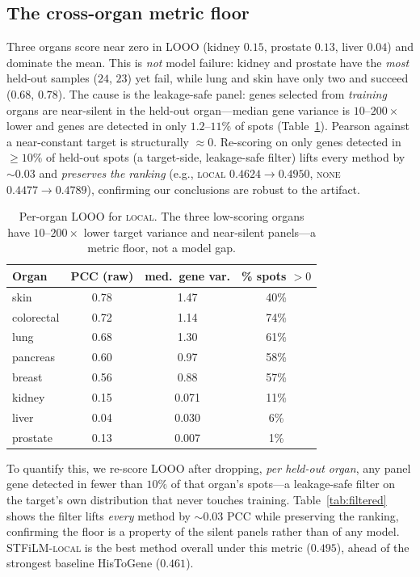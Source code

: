 \documentclass[10pt,twocolumn,letterpaper]{article}
\begin{document}
\subsection{The cross-organ metric floor}
\label{sec:floor}
Three organs score near zero in LOOO (kidney $0.15$, prostate $0.13$, liver $0.04$) and
dominate the mean. This is \emph{not} model failure: kidney and prostate have the \emph{most}
held-out samples ($24$, $23$) yet fail, while lung and skin have only two and succeed
($0.68$, $0.78$). The cause is the leakage-safe panel: genes selected from \emph{training}
organs are near-silent in the held-out organ---median gene variance is $10$--$200\times$ lower
and genes are detected in only $1.2$--$11\%$ of spots (Table~\ref{tab:floor}). Pearson against a
near-constant target is structurally $\approx 0$. Re-scoring on only genes detected in
$\ge 10\%$ of held-out spots (a target-side, leakage-safe filter) lifts every method by
${\sim}0.03$ and \emph{preserves the ranking} (e.g., \textsc{local} $0.4624\!\to\!0.4950$,
\textsc{none} $0.4477\!\to\!0.4789$), confirming our conclusions are robust to the artifact.

\begin{table}[t]
\centering
\small
\setlength{\tabcolsep}{3pt}
\begin{tabular}{lccc}
\toprule
Organ & PCC (raw) & med.\ gene var. & \% spots $>0$ \\
\midrule
skin       & 0.78 & 1.47 & 40\% \\
colorectal & 0.72 & 1.14 & 74\% \\
lung       & 0.68 & 1.30 & 61\% \\
pancreas   & 0.60 & 0.97 & 58\% \\
breast     & 0.56 & 0.88 & 57\% \\
\midrule
kidney     & 0.15 & 0.071 & 11\% \\
liver      & 0.04 & 0.030 & 6\% \\
prostate   & 0.13 & 0.007 & 1\% \\
\bottomrule
\end{tabular}
\caption{Per-organ LOOO for \textsc{local}. The three low-scoring organs have $10$--$200\times$
lower target variance and near-silent panels---a metric floor, not a model gap.}
\label{tab:floor}
\end{table}

To quantify this, we re-score LOOO after dropping, \emph{per held-out organ}, any panel gene
detected in fewer than $10\%$ of that organ's spots---a leakage-safe filter on the target's own
distribution that never touches training. Table~\ref{tab:filtered} shows the filter lifts
\emph{every} method by ${\sim}0.03$ PCC while preserving the ranking, confirming the floor is a
property of the silent panels rather than of any model. STFiLM-\textsc{local} is the best method
overall under this metric ($0.495$), ahead of the strongest baseline HisToGene ($0.461$).
\end{document}
